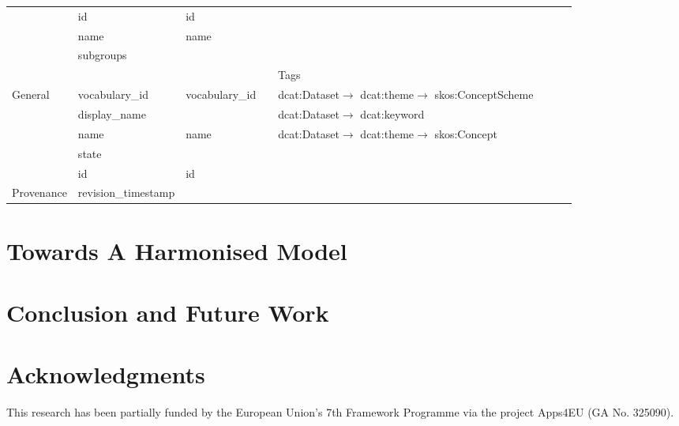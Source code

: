 \documentclass[runningheads,a4paper]{llncs}
\begin{document}
\begin{landscape}
{\begin{longtable}{|p{1cm}|m{2.3cm}|m{2.2cm}|m{2.5cm}|p{3.6cm}|m{3.6cm}|m{3.6cm}|m{2.5cm}|}
\cline{2-8}
 & id & id &  &  &  &  & \tabularnewline
\cline{2-8}
 & name & name &  &  &  &  & \tabularnewline
\cline{2-8}
 & subgroups &  &  &  &  &  & \tabularnewline
\hline
\multicolumn{8}{|c|}{Tags}\tabularnewline
\hline
\multirow{5}{2cm}{General} & vocabulary\_id & vocabulary\_id &  & dcat:Dataset$\rightarrow$ dcat:theme$\rightarrow$ skos:ConceptScheme &  &  & \tabularnewline
\cline{2-8}
 & display\_name &  &  & dcat:Dataset$\rightarrow$ dcat:keyword &  &  & \tabularnewline
\cline{2-8}
 & name & name &  & dcat:Dataset$\rightarrow$ dcat:theme$\rightarrow$ skos:Concept &  &  & \tabularnewline
\cline{2-8}
 & state &  &  &  &  &  & \tabularnewline
\cline{2-8}
 & id & id &  &  &  &  & \tabularnewline
\hline
Provenance & revision\_timestamp &  &  &  &  &  & \tabularnewline
\hline
\end{longtable}
}
\end{landscape}

\section{Towards A Harmonised Model}
\label{sec:hdl}


\section{Conclusion and Future Work}
\label{sec:conclusion}


\section*{Acknowledgments}
This research has been partially funded by the European Union's 7th Framework Programme via the project Apps4EU (GA No. 325090).
\vspace{0.5cm}


\nocite{*}

\end{document}
